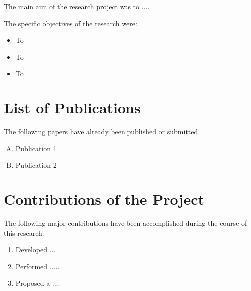 \documentclass[12pt]{report}
\begin{document}
The main aim of the research project was to ....

The specific objectives of the research were:

\begin{itemize}[topsep=0pt]

\item To 

\item To 

\item To 

\end{itemize}









\section{List of Publications}


The following papers have already been published or submitted.
\begin{enumerate}[P.1,topsep=0pt]

	\item Publication 1

	\item Publication 2

\end{enumerate}





\section{Contributions of the Project}

The following major contributions have been accomplished during the course of this research:

\begin{enumerate}[topsep=0pt]

\item Developed ...

\item Performed .....

\item Proposed a ....

\end{enumerate}
\end{document}
